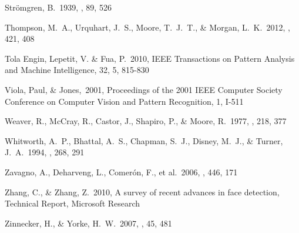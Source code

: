 \documentclass[preprint]{aastex}
\begin{document}
\begin{thebibliography}{16}
 Str{\"o}mgren, B.\ 1939, 
\apj, 89, 526 

 Thompson, M.~A., 
Urquhart, J.~S., Moore, T.~J.~T., \& Morgan, L.~K.\ 2012, \mnras, 421, 408 

Tola Engin, Lepetit, V. \& Fua, P.\ 2010, IEEE Transactions on Pattern Analysis and Machine Intelligence, 32, 5, 815-830

Viola, Paul, \& Jones,\ 2001, Proceedings of the 2001 IEEE Computer Society Conference on Computer Vision and Pattern Recognition, 1, I-511

 Weaver, R., McCray, R., 
Castor, J., Shapiro, P., \& Moore, R.\ 1977, \apj, 218, 377 

 Whitworth, A.~P., 
Bhattal, A.~S., Chapman, S.~J., Disney, M.~J., 
\& Turner, J.~A.\ 1994, \mnras, 268, 291 

 Zavagno, A., Deharveng, L., Comer{\'o}n, F., et al.\ 2006, \aap, 446, 171 

Zhang, C., \& Zhang, Z.\ 2010, A survey of recent advances in face detection, Technical Report, Microsoft Research

 Zinnecker, H., \& Yorke, H.~W.\ 2007, \araa, 45, 481 

\end{thebibliography}
\end{document}
